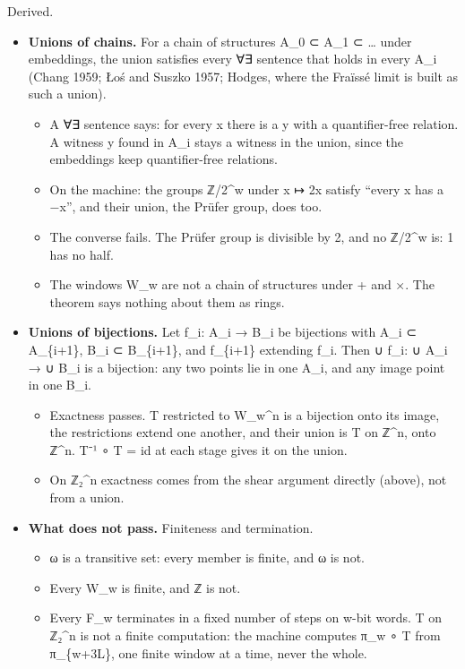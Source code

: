 Derived.

\begin{itemize}
\item \textbf{Unions of chains.} For a chain of structures A\_\allowbreak{}0 ⊂ A\_\allowbreak{}1 ⊂ … under embeddings, the union satisfies every ∀∃ sentence that holds in every A\_\allowbreak{}i (Chang 1959; Łoś and Suszko 1957; Hodges, where the Fraïssé limit is built as such a union).

\begin{itemize}
\item A ∀∃ sentence says: for every x there is a y with a quantifier-free relation. A witness y found in A\_\allowbreak{}i stays a witness in the union, since the embeddings keep quantifier-free relations.
\item On the machine: the groups ℤ/2\textasciicircum{}w under x ↦ 2x satisfy “every x has a −x”, and their union, the Prüfer group, does too.
\item The converse fails. The Prüfer group is divisible by 2, and no ℤ/2\textasciicircum{}w is: 1 has no half.
\item The windows W\_\allowbreak{}w are not a chain of structures under + and ×. The theorem says nothing about them as rings.
\end{itemize}
\item \textbf{Unions of bijections.} Let f\_\allowbreak{}i: A\_\allowbreak{}i → B\_\allowbreak{}i be bijections with A\_\allowbreak{}i ⊂ A\_\allowbreak{}\{i+1\}, B\_\allowbreak{}i ⊂ B\_\allowbreak{}\{i+1\}, and f\_\allowbreak{}\{i+1\} extending f\_\allowbreak{}i. Then ∪ f\_\allowbreak{}i: ∪ A\_\allowbreak{}i → ∪ B\_\allowbreak{}i is a bijection: any two points lie in one A\_\allowbreak{}i, and any image point in one B\_\allowbreak{}i.

\begin{itemize}
\item Exactness passes. T restricted to W\_\allowbreak{}w\textasciicircum{}n is a bijection onto its image, the restrictions extend one another, and their union is T on ℤ\textasciicircum{}n, onto ℤ\textasciicircum{}n. T⁻¹ ∘ T = id at each stage gives it on the union.
\item On ℤ₂\textasciicircum{}n exactness comes from the shear argument directly (above), not from a union.
\end{itemize}
\item \textbf{What does not pass.} Finiteness and termination.

\begin{itemize}
\item ω is a transitive set: every member is finite, and ω is not.
\item Every W\_\allowbreak{}w is finite, and ℤ is not.
\item Every F\_\allowbreak{}w terminates in a fixed number of steps on w-bit words. T on ℤ₂\textasciicircum{}n is not a finite computation: the machine computes π\_\allowbreak{}w ∘ T from π\_\allowbreak{}\{w+3L\}, one finite window at a time, never the whole.
\end{itemize}
\end{itemize}

